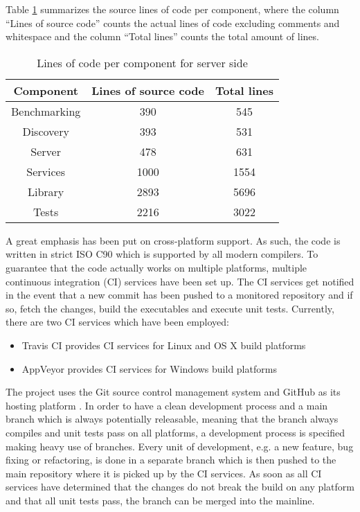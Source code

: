 Table \ref{tab:sloc} summarizes the source lines of code per component, where the column ``Lines of source code'' counts the actual lines of code excluding comments and whitespace and the column ``Total lines'' counts the total amount of lines.
\begin{table}[t]
    \centering
    \begin{tabular}{|c|c|c|}
        \hline
        \bfseries Component & \bfseries Lines of source code & \bfseries Total lines\\
        \hline
        Benchmarking & 390 & 545\\
        \hline
        Discovery & 393 & 531\\
        \hline
        Server & 478 & 631\\
        \hline
        Services & 1000 & 1554\\
        \hline
        Library & 2893 & 5696\\
        \hline
        Tests & 2216 & 3022 \\
        \hline
    \end{tabular}
    \caption{Lines of code per component for server side}
    \label{tab:sloc}
\end{table}

A great emphasis has been put on cross-platform support.
As such, the code is written in strict ISO C90 \cite{iso-c90} which is supported by all modern compilers.
To guarantee that the code actually works on multiple platforms, multiple continuous integration (CI) services have been set up.
The CI services get notified in the event that a new commit has been pushed to a monitored repository and if so, fetch the changes, build the executables and execute unit tests.
Currently, there are two CI services which have been employed:
\begin{itemize}
    \item Travis CI \cite{travis} provides CI services for Linux and OS X build platforms
    \item AppVeyor \cite{appveyor} provides CI services for Windows build platforms
\end{itemize}

The project uses the Git source control management system \cite{git} and GitHub as its hosting platform \cite{github}.
In order to have a clean development process and a main branch which is always potentially releasable, meaning that the branch always compiles and unit tests pass on all platforms, a development process is specified making heavy use of branches.
Every unit of development, e.g. a new feature, bug fixing or refactoring, is done in a separate branch which is then pushed to the main repository where it is picked up by the CI services.
As soon as all CI services have determined that the changes do not break the build on any platform and that all unit tests pass, the branch can be merged into the mainline.

